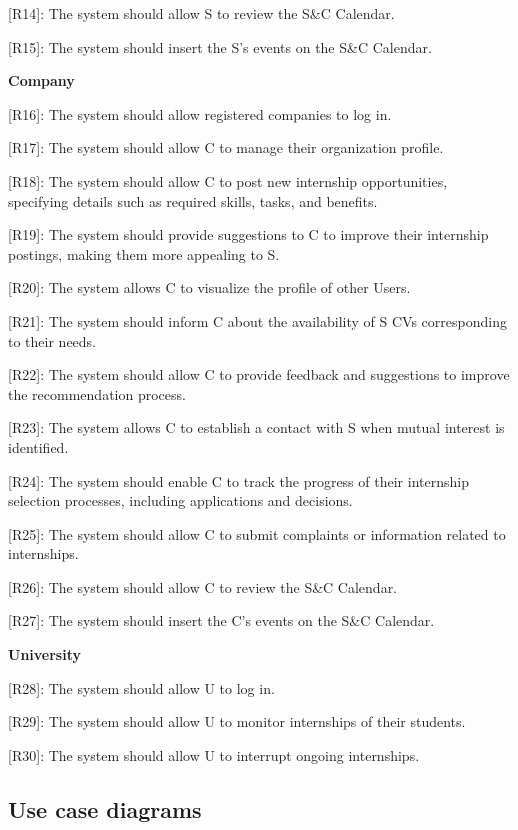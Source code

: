{[}R14{]}: The system should allow S to review the S\&C Calendar.

{[}R15{]}: The system should insert the S's events on the S\&C Calendar.

\textbf{Company}

{[}R16{]}: The system should allow registered companies to log in.

{[}R17{]}: The system should allow C to manage their organization
profile.

{[}R18{]}: The system should allow C to post new internship
opportunities, specifying details such as required skills, tasks, and
benefits.

{[}R19{]}: The system should provide suggestions to C to improve their
internship postings, making them more appealing to S.

{[}R20{]}: The system allows C to visualize the profile of other Users.

{[}R21{]}: The system should inform C about the availability of S CVs
corresponding to their needs.

{[}R22{]}: The system should allow C to provide feedback and suggestions
to improve the recommendation process.

{[}R23{]}: The system allows C to establish a contact with S when mutual
interest is identified.

{[}R24{]}: The system should enable C to track the progress of their
internship selection processes, including applications and decisions.

{[}R25{]}: The system should allow C to submit complaints or information
related to internships.

{[}R26{]}: The system should allow C to review the S\&C Calendar.

{[}R27{]}: The system should insert the C's events on the S\&C Calendar.

\textbf{University}

{[}R28{]}: The system should allow U to log in.

{[}R29{]}: The system should allow U to monitor internships of their
students.

{[}R30{]}: The system should allow U to interrupt ongoing internships.


\subsection{Use case diagrams}
\label{subsec:use_case_diagrams}%



